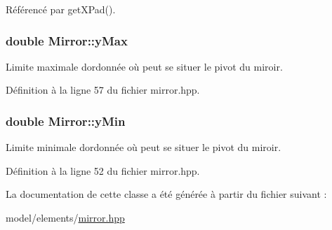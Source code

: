 Référencé par get\+X\+Pad().

\hypertarget{classMirror_a2e76c506f910e388db245355ab17ce3a}{}
\subsubsection[{y\+Max}]{\setlength{\rightskip}{0pt plus 5cm}double Mirror\+::y\+Max\hspace{0.3cm}{\ttfamily [private]}}\label{classMirror_a2e76c506f910e388db245355ab17ce3a}


Limite maximale d\textquotesingle{}ordonnée où peut se situer le pivot du miroir. 



Définition à la ligne 57 du fichier mirror.\+hpp.

\hypertarget{classMirror_a4b18a9326165e36b1ae05604b34ce758}{}
\subsubsection[{y\+Min}]{\setlength{\rightskip}{0pt plus 5cm}double Mirror\+::y\+Min\hspace{0.3cm}{\ttfamily [private]}}\label{classMirror_a4b18a9326165e36b1ae05604b34ce758}


Limite minimale d\textquotesingle{}ordonnée où peut se situer le pivot du miroir. 



Définition à la ligne 52 du fichier mirror.\+hpp.



La documentation de cette classe a été générée à partir du fichier suivant \+:\begin{DoxyCompactItemize}
\item 
model/elements/\hyperlink{mirror_8hpp}{mirror.\+hpp}\end{DoxyCompactItemize}
